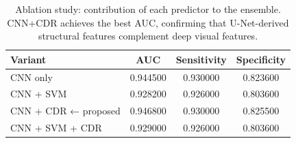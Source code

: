 \begin{table}
\caption{Ablation study: contribution of each predictor to the ensemble. CNN+CDR achieves the best AUC, confirming that U-Net-derived structural features complement deep visual features.}
\label{tab:ablation}
\begin{tabular}{lccc}
\toprule
Variant & AUC & Sensitivity & Specificity \\
\midrule
CNN only & 0.944500 & 0.930000 & 0.823600 \\
CNN + SVM & 0.928200 & 0.926000 & 0.803600 \\
CNN + CDR ← proposed & 0.946800 & 0.930000 & 0.825500 \\
CNN + SVM + CDR & 0.929000 & 0.926000 & 0.803600 \\
\bottomrule
\end{tabular}
\end{table}

